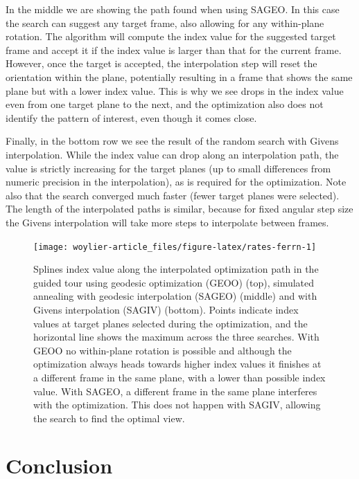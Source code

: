 In the middle we are showing the path found when using SAGEO. In this case the search can suggest any target frame, also allowing for any within-plane rotation. The algorithm will compute the index value for the suggested target frame and accept it if the index value is larger than that for the current frame. However, once the target is accepted, the interpolation step will reset the orientation within the plane, potentially resulting in a frame that shows the same plane but with a lower index value. This is why we see drops in the index value even from one target plane to the next, and the optimization also does not identify the pattern of interest, even though it comes close.

Finally, in the bottom row we see the result of the random search with Givens interpolation. While the index value can drop along an interpolation path, the value is strictly increasing for the target planes (up to small differences from numeric precision in the interpolation), as is required for the optimization. Note also that the search converged much faster (fewer target planes were selected). The length of the interpolated paths is similar, because for fixed angular step size the Givens interpolation will take more steps to interpolate between frames.

\begin{figure}

{\centering \texttt{[image: woylier-article\_files/figure-latex/rates-ferrn-1]} 

}

\caption{Splines index value along the interpolated optimization path in the guided tour using geodesic optimization (GEOO) (top), simulated annealing with geodesic interpolation  (SAGEO) (middle) and with Givens interpolation (SAGIV) (bottom). Points indicate index values at target planes selected during the optimization, and the horizontal line shows the maximum across the three searches. With GEOO no within-plane rotation is possible and although the optimization always heads towards higher index values it finishes at a different frame in the same plane, with a lower than possible index value. With SAGEO, a different frame in the same plane interferes with the optimization. This does not happen with SAGIV, allowing the search to find the optimal view.}\label{fig:rates-ferrn}
\end{figure}

\hypertarget{conclusion}{%
\section{Conclusion}\label{conclusion}}

